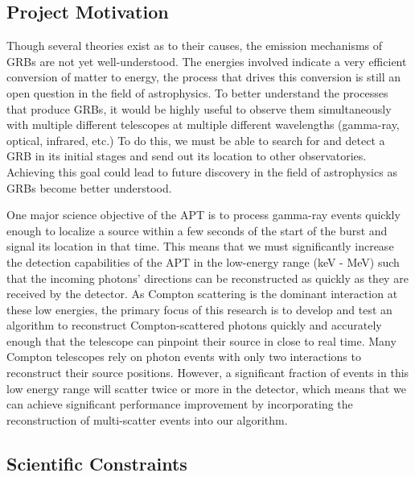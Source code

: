 \subsection{Project Motivation}
Though several theories exist as to their causes, the emission mechanisms of GRBs are not yet well-understood. The energies involved indicate a very efficient conversion of matter to energy, the process that drives this conversion is still an open question in the field of astrophysics. To better understand the processes that produce GRBs, it would be highly useful to observe them simultaneously with multiple different telescopes at multiple different wavelengths (gamma-ray, optical, infrared, etc.) To do this, we must be able to search for and detect a GRB in its initial stages and send out its location to other observatories. Achieving this goal could lead to future discovery in the field of astrophysics as GRBs become better understood.

One major science objective of the APT is to process gamma-ray events quickly enough to localize a source within a few seconds of the start of the burst and signal its location in that time. This means that we must significantly increase the detection capabilities of the APT in the low-energy range (keV - MeV) such that the incoming photons' directions can be reconstructed as quickly as they are received by the detector. As Compton scattering is the dominant interaction at these low energies, the primary focus of this research is to develop and test an algorithm to reconstruct Compton-scattered photons quickly and accurately enough that the telescope can pinpoint their source in close to real time. Many Compton telescopes rely on photon events with only two interactions to reconstruct their source positions. However, a significant fraction of events in this low energy range will scatter twice or more in the detector, which means that we can achieve significant performance improvement by incorporating the reconstruction of multi-scatter events into our algorithm.

\subsection{Scientific Constraints}


